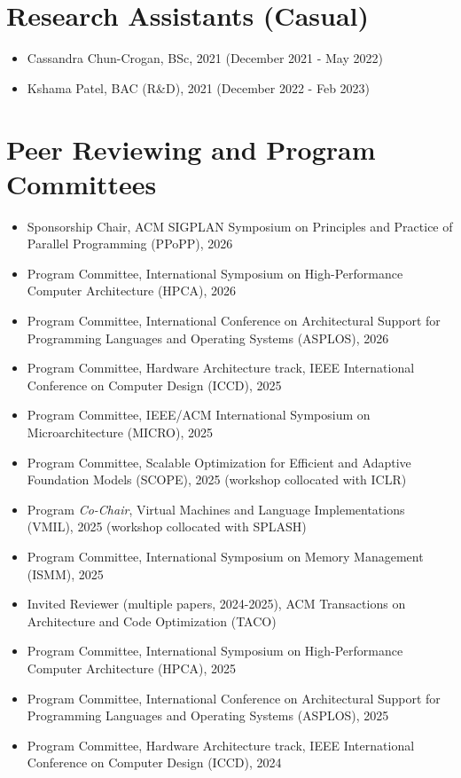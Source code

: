 \documentclass[singlecolumn,singlespace,11pt]{article}
\begin{document}
\section*{Research Assistants (Casual)}
\begin{itemize}
\item Cassandra Chun-Crogan, BSc, 2021 (December 2021 - May 2022)
\item Kshama Patel, BAC (R\&D), 2021 (December 2022 - Feb 2023)
\end{itemize}


\section*{Peer Reviewing and Program Committees}
\begin{itemize}
\item Sponsorship Chair, ACM SIGPLAN Symposium on Principles and Practice of Parallel Programming (PPoPP), 2026
\item Program Committee, International Symposium on High-Performance Computer Architecture (HPCA), 2026
\item Program Committee, International Conference on Architectural Support for Programming Languages and Operating Systems (ASPLOS), 2026
\item Program Committee, Hardware Architecture track, IEEE International Conference on Computer Design (ICCD), 2025 
\item Program Committee, IEEE/ACM International Symposium on Microarchitecture (MICRO), 2025
\item Program Committee, Scalable Optimization for Efficient and Adaptive Foundation Models (SCOPE), 2025 (workshop collocated with ICLR)
\item Program \textit{Co-Chair}, Virtual Machines and Language Implementations (VMIL), 2025 (workshop collocated with SPLASH)
\item Program Committee, International Symposium on Memory Management (ISMM), 2025
\item Invited Reviewer (multiple papers, 2024-2025), ACM Transactions on Architecture and Code Optimization (TACO)
\item Program Committee, International Symposium on High-Performance Computer Architecture (HPCA), 2025
\item Program Committee, International Conference on Architectural Support for Programming Languages and Operating Systems (ASPLOS), 2025
\item Program Committee, Hardware Architecture track, IEEE International Conference on Computer Design (ICCD), 2024 

\end{itemize}
\end{document}
